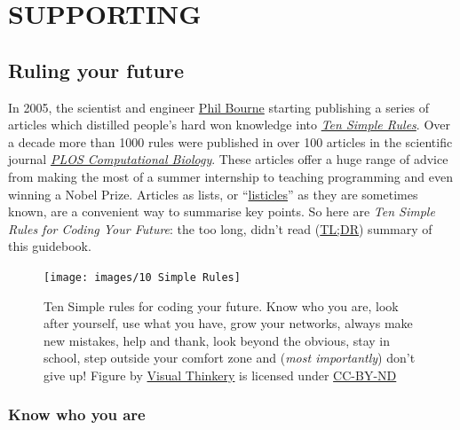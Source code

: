 \documentclass[
]{book}
\begin{document}
\hypertarget{part-supporting}{%
\part{SUPPORTING}\label{part-supporting}}

\hypertarget{ruling}{%
\chapter{Ruling your future}\label{ruling}}

In 2005, the scientist and engineer \href{https://en.wikipedia.org/wiki/Philip_Bourne}{Phil Bourne} starting publishing a series of articles which distilled people's hard won knowledge into \emph{\href{https://collections.plos.org/ten-simple-rules}{Ten Simple Rules}}. \citep{Bourne2005} Over a decade more than 1000 rules were published in over 100 articles in the scientific journal \emph{\href{https://en.wikipedia.org/wiki/PLOS_Computational_Biology}{PLOS Computational Biology}}. \citep{Bourne2018} These articles offer a huge range of advice from making the most of a summer internship \citep{Aicher2017} to teaching programming \citep{tensimplebrown} and even winning a Nobel Prize. \citep{Roberts2015} Articles as lists, or ``\href{https://en.wikipedia.org/wiki/Listicle}{listicles}'' as they are sometimes known, are a convenient way to summarise key points. So here are \emph{Ten Simple Rules for Coding Your Future}: the too long, didn't read (\href{https://en.wiktionary.org/wiki/too_long;_didn\%27t_read}{TL;DR}) summary of this guidebook.

\begin{figure}

{\centering \texttt{[image: images/10 Simple Rules]} 

}

\caption{Ten Simple rules for coding your future. Know who you are, look after yourself, use what you have, grow your networks, always make new mistakes, help and thank, look beyond the obvious, stay in school, step outside your comfort zone and (\emph{most importantly}) don't give up! Figure by \href{https://visualthinkery.com/}{Visual Thinkery} is licensed under \href{https://creativecommons.org/licenses/by-nd/4.0/}{CC-BY-ND}}\label{fig:ten-simple-fig}
\end{figure}



\hypertarget{mybrand}{%
\section{Know who you are}\label{mybrand}}
\end{document}
